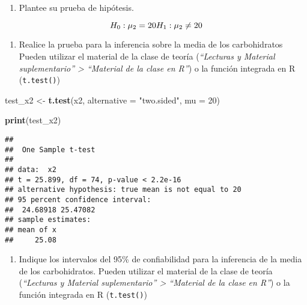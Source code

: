 \documentclass[
]{article}
\newenvironment{Shaded}{\begin{snugshade}}{\end{snugshade}}
\newcommand{\AttributeTok}[1]{\textcolor[rgb]{0.13,0.29,0.53}{#1}}
\newcommand{\DecValTok}[1]{\textcolor[rgb]{0.00,0.00,0.81}{#1}}
\newcommand{\FunctionTok}[1]{\textcolor[rgb]{0.13,0.29,0.53}{\textbf{#1}}}
\newcommand{\NormalTok}[1]{#1}
\newcommand{\OtherTok}[1]{\textcolor[rgb]{0.56,0.35,0.01}{#1}}
\newcommand{\SpecialCharTok}[1]{\textcolor[rgb]{0.81,0.36,0.00}{\textbf{#1}}}
\newcommand{\StringTok}[1]{\textcolor[rgb]{0.31,0.60,0.02}{#1}}
\providecommand{\tightlist}{%
  \setlength{\itemsep}{0pt}\setlength{\parskip}{0pt}}
\begin{document}
\begin{enumerate}
\def\labelenumi{\alph{enumi}.}
\tightlist
\item
  Plantee su prueba de hipótesis.
\end{enumerate}

\[
H_0:  \mu_2 = 20\\
H_1: \mu_2 \neq 20
\]

\begin{enumerate}
\def\labelenumi{\alph{enumi}.}
\setcounter{enumi}{1}
\tightlist
\item
  Realice la prueba para la inferencia sobre la media de los
  carbohidratos Pueden utilizar el material de la clase de teoría
  (\emph{``Lecturas y Material suplementario'' \textgreater{} ``Material
  de la clase en R''}) o la función integrada en R (\texttt{t.test()})
\end{enumerate}

\begin{Shaded}
\begin{Highlighting}[]
\NormalTok{test\_x2 }\OtherTok{\textless{}{-}} \FunctionTok{t.test}\NormalTok{(x2, }\AttributeTok{alternative =} \StringTok{"two.sided"}\NormalTok{, }\AttributeTok{mu =} \DecValTok{20}\NormalTok{)}

\FunctionTok{print}\NormalTok{(test\_x2)}
\end{Highlighting}
\end{Shaded}

\begin{verbatim}
## 
##  One Sample t-test
## 
## data:  x2
## t = 25.899, df = 74, p-value < 2.2e-16
## alternative hypothesis: true mean is not equal to 20
## 95 percent confidence interval:
##  24.68918 25.47082
## sample estimates:
## mean of x 
##     25.08
\end{verbatim}

\begin{enumerate}
\def\labelenumi{\alph{enumi}.}
\setcounter{enumi}{2}
\tightlist
\item
  Indique los intervalos del 95\% de confiabilidad para la inferencia de
  la media de los carbohidratos. Pueden utilizar el material de la clase
  de teoría (\emph{``Lecturas y Material suplementario'' \textgreater{}
  ``Material de la clase en R''}) o la función integrada en R
  (\texttt{t.test()})
\end{enumerate}

\begin{Shaded}
\end{Shaded}
\end{document}
